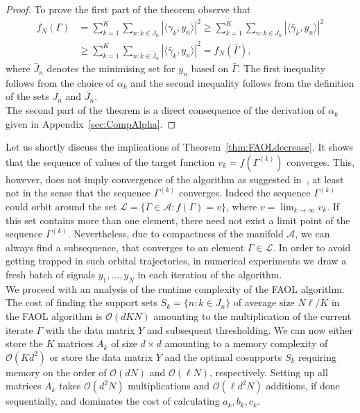 \documentclass[11pt, onecolumn, journal,compsoc]{IEEEtran}
\newcommand\ip[2]{\langle #1, #2\rangle}
\newcommand\bGamma{\bar\Gamma}
\newcommand\bgamma{\bar\gamma}
\newcommand{\Ocal}{\mathcal{O}}
\newcommand{\Acal}{\mathcal{A}}
\theoremstyle{plain}
\theoremstyle{remark}
\begin{document}
\begin{proof}
To prove the first part of the theorem observe that
\ifthenelse{\boolean{onecol}}{
\[f(\Gamma) = \sum_{k=1}^K \sum_{n\colon k\in J_n} |\ip{\gamma_k}{y_n}|^2\geq \sum_{k=1}^K \sum_{n\colon k\in J_n} |\ip{\bgamma_k}{y_n}|^2\geq \sum_{k=1}^K \sum_{n\colon k\in \bar J_n} |\ip{\bgamma_k}{y_n}|^2 = f(\bGamma).\]}
{
\begin{align*}
f_N(\Gamma) & = \sum_{k=1}^K \sum_{n\colon k\in J_n} |\ip{\gamma_k}{y_n}|^2 \geq \sum_{k=1}^K \sum_{n\colon k\in J_n} |\ip{\bgamma_k}{y_n}|^2\\
&\geq \sum_{k=1}^K \sum_{n\colon k\in \bar J_n} |\ip{\bgamma_k}{y_n}|^2 = f_N(\bGamma),
\end{align*}
}
where $\bar J_n$ denotes the minimising set for $y_n$ based on $\bar \Gamma$.
The first inequality follows from the choice of $\alpha_k$ and the second inequality follows from the definition of the sets $J_n$ and $\bar J_n$. \\
The second part of the theorem is a direct consequence of the derivation of $\alpha_k$ given in Appendix~\ref{sec:CompAlpha}.
\end{proof}
%
Let us shortly discuss the implications of Theorem~\ref{thm:FAOLdecrease}. It shows that the sequence of values of the target function $v_k = f(\Gamma^{(k)})$ converges. This, however, does not imply convergence of the algorithm as suggested in~\cite{dowadaplha16}, at least not in the sense that the sequence $\Gamma^{(k)}$ converges. Indeed the sequence $\Gamma^{(k)}$ could orbit around the set $\mathcal{L} = \{\Gamma\in\Acal\colon f(\Gamma) = v\}$, where $v = \lim_{k\to\infty} v_k$. 
If this set contains more than one element, there need not exist a limit point of the sequence $\Gamma^{(k)}$. Nevertheless, due to compactness of the manifold $\Acal$, we can always find a subsequence, that converges to an element $\Gamma\in\mathcal{L}$. In order to avoid getting trapped in such orbital trajectories, in numerical experiments we draw a fresh batch of signals $y_1,\ldots, y_N$ in each iteration of the algorithm.
\\
We proceed with an analysis of the runtime complexity of the FAOL algorithm.
The cost of finding the support sets $S_k = \{n\colon k\in J_n\}$ of average size $N\ell/K$ in the FAOL algorithm is $\Ocal(dKN)$ amounting to the multiplication of the current iterate $\Gamma$ with the data matrix $Y$ and subsequent thresholding.
We can now either store the $K$ matrices $A_k$ of size $d\times d$ amounting to a memory complexity of $\Ocal(Kd^2)$ or store the data matrix $Y$ and the optimal cosupports $S_k$ requiring memory on the order of $\Ocal(dN)$ and $\Ocal(\ell N)$, respectively. Setting up all matrices $A_k$   takes $\Ocal(d^2N)$ multiplications and $\Ocal(\ell d^2N)$ additions, if done sequentially, and dominates the cost of calculating $a_k, b_k,c_k$.
\end{document}
